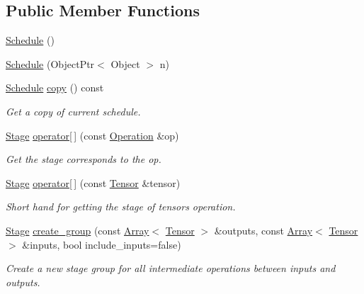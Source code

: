 \subsection*{Public Member Functions}
\begin{DoxyCompactItemize}
\item 
\hyperlink{classtvm_1_1te_1_1Schedule_a1eb19ccb06835a11edc39ed1410f01af}{Schedule} ()
\item 
\hyperlink{classtvm_1_1te_1_1Schedule_a5f6a71ca3b51eb6cc0b65ee029ff9c96}{Schedule} (Object\+Ptr$<$ Object $>$ n)
\item 
\hyperlink{classtvm_1_1te_1_1Schedule}{Schedule} \hyperlink{classtvm_1_1te_1_1Schedule_a4991e4eaf1992f45708966c335b92307}{copy} () const 
\begin{DoxyCompactList}\small\item\em Get a copy of current schedule. \end{DoxyCompactList}\item 
\hyperlink{classtvm_1_1te_1_1Stage}{Stage} \hyperlink{classtvm_1_1te_1_1Schedule_a3f63b27dcbddd06c550cc1a5a6562717}{operator\mbox{[}$\,$\mbox{]}} (const \hyperlink{classtvm_1_1te_1_1Operation}{Operation} \&op)
\begin{DoxyCompactList}\small\item\em Get the stage corresponds to the op. \end{DoxyCompactList}\item 
\hyperlink{classtvm_1_1te_1_1Stage}{Stage} \hyperlink{classtvm_1_1te_1_1Schedule_a2040189df3b89304a12acce3efff04a6}{operator\mbox{[}$\,$\mbox{]}} (const \hyperlink{classtvm_1_1te_1_1Tensor}{Tensor} \&tensor)
\begin{DoxyCompactList}\small\item\em Short hand for getting the stage of tensor\textquotesingle{}s operation. \end{DoxyCompactList}\item 
\hyperlink{classtvm_1_1te_1_1Stage}{Stage} \hyperlink{classtvm_1_1te_1_1Schedule_a638e7b946df3b5d2e2cde3acc0201da0}{create\+\_\+group} (const \hyperlink{classtvm_1_1Array}{Array}$<$ \hyperlink{classtvm_1_1te_1_1Tensor}{Tensor} $>$ \&outputs, const \hyperlink{classtvm_1_1Array}{Array}$<$ \hyperlink{classtvm_1_1te_1_1Tensor}{Tensor} $>$ \&inputs, bool include\+\_\+inputs=false)
\begin{DoxyCompactList}\small\item\em Create a new stage group for all intermediate operations between inputs and outputs. \end{DoxyCompactList}\item 

\end{DoxyCompactItemize}
